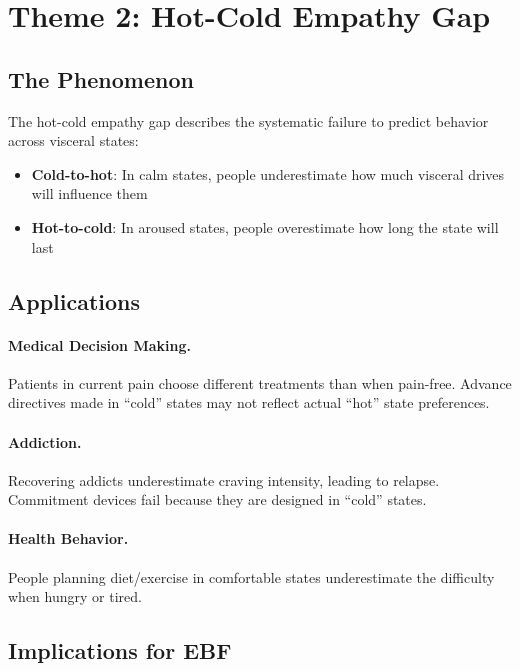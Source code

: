 \section{Theme 2: Hot-Cold Empathy Gap}
\label{sec:lo-hotcold}

\subsection{The Phenomenon}

The hot-cold empathy gap \citep{loewenstein2006hot} describes the systematic failure to predict behavior across visceral states:

\begin{itemize}[nosep]
\item \textbf{Cold-to-hot}: In calm states, people underestimate how much visceral drives will influence them
\item \textbf{Hot-to-cold}: In aroused states, people overestimate how long the state will last
\end{itemize}

\subsection{Applications}

\paragraph{Medical Decision Making.} Patients in current pain choose different treatments than when pain-free. Advance directives made in ``cold'' states may not reflect actual ``hot'' state preferences.

\paragraph{Addiction.} Recovering addicts underestimate craving intensity, leading to relapse. Commitment devices fail because they are designed in ``cold'' states.

\paragraph{Health Behavior.} People planning diet/exercise in comfortable states underestimate the difficulty when hungry or tired.

\subsection{Implications for EBF}


